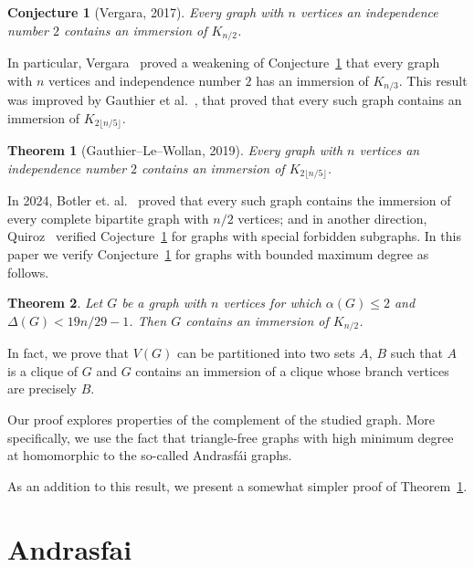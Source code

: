 \documentclass[a4paper,12pt]{article}
\newtheorem{theorem}{Theorem}
\newtheorem{conjecture}{Conjecture}
\begin{document}
\begin{conjecture}[Vergara, 2017]\label{conj:vergara}
	Every graph with \(n\) vertices an independence number \(2\)
	contains an immersion of \(K_{n/2}\).
\end{conjecture}

In particular, Vergara~\cite{vergara2017complete} proved a weakening of Conjecture~\ref{conj:vergara} that every graph with \(n\) vertices and independence number \(2\)
has an immersion of \(K_{n/3}\).
This result was improved by Gauthier et al.~\cite{gauthier2019forcing},
that proved that every such graph contains an immersion of \(K_{2\lfloor n/5\rfloor}\).

\begin{theorem}[Gauthier--Le--Wollan, 2019]\label{thm:gauthier}
	Every graph with \(n\) vertices an independence number \(2\)
	contains an immersion of \(K_{2\lfloor n/5\rfloor}\).
\end{theorem}

In 2024, Botler et. al.~\cite{botler2024biclique} proved that every such graph
contains the immersion of every complete bipartite graph with \(n/2\) vertices;
and in another direction, Quiroz~\cite{quiroz2021clique} verified Cojecture~\ref{conj:vergara} for graphs with special forbidden subgraphs.
In this paper we verify Conjecture~\ref{conj:vergara} for graphs with bounded maximum degree
as follows.

\begin{theorem}\label{thm:main}
Let \(G\) be a graph with \(n\) vertices for which \(\alpha(G) \leq 2\) 
and \(\Delta(G) < 19n/29 - 1\).
Then \(G\) contains an immersion of \(K_{n/2}\).
\end{theorem}

In fact, we prove that \(V(G)\) can be partitioned into two sets \(A\), \(B\)
such that \(A\) is a clique of \(G\) and \(G\) contains an immersion of a clique whose
branch vertices are precisely \(B\).

Our proof explores properties of the complement of the studied graph.
More specifically, we use the fact that triangle-free graphs 
with high minimum degree at homomorphic to the so-called Andrasfái graphs.

As an addition to this result, we present a somewhat simpler proof of Theorem~\ref{thm:gauthier}.

\section{Andrasfai}
\end{document}
